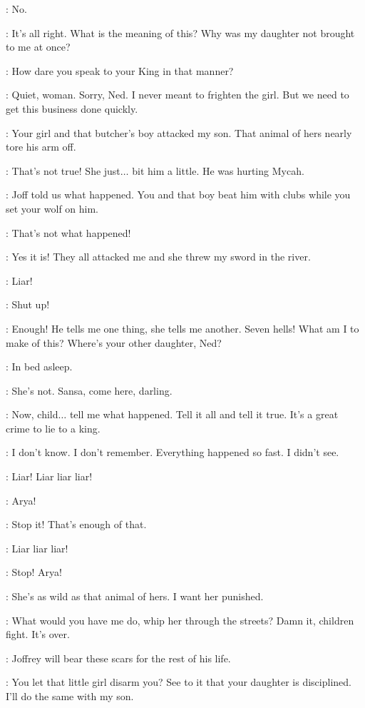 \ARYA: No. 

\NED: It's all right. What is the meaning of this? Why was my daughter not brought to me at once? 

\CERSEI: How dare you speak to your King in that manner? 

\ROBERT: Quiet, woman. Sorry, Ned. I never meant to frighten the girl. But we need to get this business done quickly. 

\CERSEI: Your girl and that butcher's boy attacked my son. That animal of hers nearly tore his arm off. 

\ARYA: That's not true! She just$\ldots$ bit him a little. He was hurting Mycah. 

\CERSEI: Joff told us what happened. You and that boy beat him with clubs while you set your wolf on him. 

\ARYA: That's not what happened! 

\JOFFREY: Yes it is! They all attacked me and she threw my sword in the river. 

\ARYA: Liar! 

\JOFFREY: Shut up! 

\ROBERT: Enough! He tells me one thing, she tells me another. Seven hells! What am I to make of this? Where's your other daughter, Ned? 

\NED: In bed asleep. 

\CERSEI: She's not. Sansa, come here, darling. 

\ROBERT: Now, child$\ldots$ tell me what happened. Tell it all and tell it true. It's a great crime to lie to a	king. 

\SANSA: I don't know. I don't remember. Everything happened so fast. I didn't see. 

\ARYA: Liar! Liar liar liar! 

\SANSA: Arya! 

\NED: Stop it! That's enough of that. 

\ARYA: Liar liar liar! 

\NED: Stop! Arya! 

\CERSEI: She's as wild as that animal of hers. I want her punished. 

\ROBERT: What would you have me do, whip her through the streets? Damn it, children fight. It's over. 

\CERSEI: Joffrey will bear these scars for the rest of his life. 

\ROBERT: You let that little girl disarm you? See to it that your daughter is disciplined. I'll do the same with my son. 

